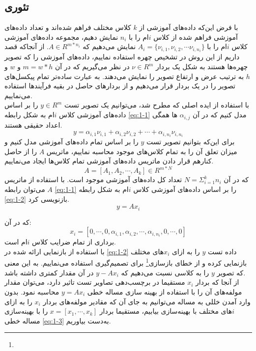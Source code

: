 \documentclass[12pt,twocolumn]{article}
\newcommand{\enfootnote}[1]{\footnote{\lr{#1}}}
\begin{document}
\subsection{تئوری}
با فرض این‌که داده‌های آموزشی از $k$ کلاس مختلف فراهم شده‌اند و تعداد داده‌های آموزشی فراهم شده از کلاس $i$ام را با $n_i$ نمایش دهیم، مجموعه  داده‌های آموزشی کلاس $i$ام را با
 $A_i=\{\nu_{i,1}, \nu_{i,2}, \cdots \nu_{i,n_i}\}$
 نمایش می‌دهیم که $A\in R^{m*n_i}$. از آنجا‌که قصد داریم از این روش در تشخیص چهره استفاده نماییم، داده‌های آموزشی را که تصویر چهره‌ها هستند به شکل یک بردار $\nu \in R^m$ در نظر می‌گیریم که در آن $m = w * h$ و $w$ و $h$ به ترتیب عرض و ارتفاع تصویر را نمایش می‌دهند. به عبارت ساده‌تر تمام پیکسل‌های تصویر را در یک بردار قرار می‌دهیم و از بردارهای حاصل در بقیه فرآیند‌ها استفاده می‌نماییم.
 \\
 با استفاده از ایده اصلی که مطرح شد، می‌توانیم یک تصویر تست $y \in R^m$ را بر اساس داده‌های آموزشی کلاس $i$ام به شکل رابطه \eqref{eq:1-1} مدل‌ کنیم که در آن $\alpha_{i,j}$ ها همگی اعداد حقیقی هستند.
 \begin{equation}
 y = \alpha_{i,1} \nu_{i,1} +\alpha_{i,2} \nu_{i,2} + \cdots +\alpha_{i,n_i} \nu_{i,n_i} 
 \label{eq:1-1}
 \end{equation}
برای این‌که بتوانیم تصویر تست $y$ را بر اساس تمام داده‌های آموزشی مدل کنیم و میزان تعلق آن را به تمام کلاس‌های موجود محاسبه نماییم، ماتریس $A$ را از حاصل کنارهم قرار دادن ماتریس داده‌های آموزشی تمام کلاس‌ها ایجاد می‌نماییم. 
\[
A = [A_1 , A_2 , \cdots, A_k] \in R^{m*N}
\]
که در آن $N = \Sigma_{i=1}^k n_i$ تعداد کل داده‌های آموزشی موجود است. با استفاده از ماتریس $A$ می‌توان رابطه \eqref{eq:1-1} را بر اساس داده‌های آموزشی کلاس $i$ام به شکل رابطه \eqref{eq:1-2} بازنویسی کرد.
\begin{equation}
y = Ax_i
\label{eq:1-2}
\end{equation}

که در آن:
\[
x_i = [0,\cdots,0, \alpha_{i,1}, \alpha_{i,2}, \cdots, \alpha_{i,n_i}, 0 , \cdots, 0]
\]
برداری از تمام ضرایب کلاس $i$ام است.
\\
با استفاده از بازنمایی ارائه شده در \eqref{eq:1-2} داده تست $y$ را به ازای $x_i$های مختلف بازنمایی کرده و از خطای بازسازی\enfootnote{Reconstruction Error} برای تصمیم‌گیری استفاده می‌نماییم. به این معنی که تصویر $y$ را به کلاسی نسبت می‌دهیم که $y - Ax_i$ در آن مقدار کمتری داشته باشد.
\\
از آنجا که بردار $x_i$ مستقیما در برچسب‌دهی تصاویر تست تاثیر دارد، می‌توان مقدار مولفه‌های آن را با استفاده از بهینه سازی مساله خطی $y = Ax_i$ محاسبه نمود. بدون وارد آمدن خللی به مساله می‌توانیم به جای آن که مقادیر مولفه‌های بردار $x_i$ را به ازای $i$های مختلف با بهینه‌سازی بیابیم، مستقیما بردار $x = [x_1,\cdots,x_k]$ را با بهینه‌سازی مساله خطی \eqref{eq:1-3} به‌دست‌ بیاوریم.
\end{document}

